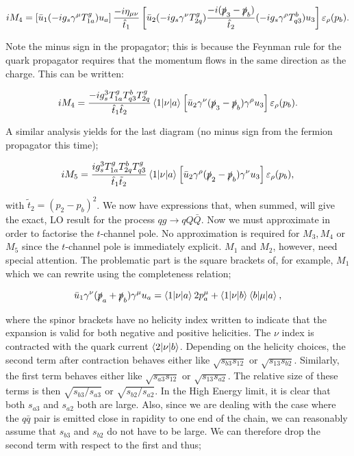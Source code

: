 \begin{equation}
iM_4 = \left[\bar{u}_1 (-i g_s \gamma^\mu T^g_{1a}) u_a \right] \frac{-i \eta_{\mu \nu}}{\hat{t}_1} \left[\bar{u}_2 (-i g_s \gamma^\nu T^g_{2q}) \frac{-i (\slashed{p}_3 - \slashed{p}_b )}{\hat{t}_2} (-i g_s \gamma^\rho T^b_{q3})u_3 \right] \varepsilon_\rho (p_b).
\end{equation}

Note the minus sign in the propagator; this is because the Feynman rule for the quark propagator requires that the momentum flows in the same direction as the charge. This can be written:

\begin{equation}
iM_4 = \frac{-i g_s^3 T^g_{1a}T^b_{q3}T^g_{2q}}{\hat{t}_1 \hat{t}_2} \mathinner{\langle1\vert\nu\vert a\rangle}_{}\left[\bar{u}_2 \gamma^\nu (\slashed{p}_3 - \slashed{p}_b) \gamma^\rho u_3 \right] \varepsilon_\rho (p_b).
\end{equation}

A similar analysis yields for the last diagram (no minus sign from the fermion propagator this time);

\begin{equation}
iM_5 = \frac{i g_s^3 T^g_{1a}T^b_{2q}T^g_{q3}}{\hat{t}_1 \tilde{t}_2} \mathinner{\langle1\vert\nu\vert a\rangle}_{}\left[\bar{u}_2 \gamma^\rho (\slashed{p}_2 - \slashed{p}_b) \gamma^\nu u_3 \right] \varepsilon_\rho (p_b),
\end{equation}

with $\tilde{t}_2 = (p_2 - p_b)^2$. We now have expressions that, when summed, will give the exact, LO result for the process $qg \to qQ\bar{Q}$. Now we must approximate in order to factorise the $t$-channel pole. No approximation is required for $M_3, M_4$ or $M_5$ since the $t$-channel pole is immediately explicit. $M_1$ and $M_2$, however, need special attention. The problematic part is the square brackets of, for example, $M_1$ which we can rewrite using the completeness relation;

\begin{equation}
\bar{u}_1 \gamma^\nu (\slashed{p}_a + \slashed{p}_b) \gamma^\mu u_a = \mathinner{\langle1\vert\nu\vert a\rangle}_{}2 p_a^\mu + \mathinner{\langle1\vert\nu\vert b\rangle}_{} \mathinner{\langle b\vert\mu\vert a\rangle}_{},
\end{equation}

where the spinor brackets have no helicity index written to indicate that the expansion is valid for both negative and positive helicities. The $\nu$ index is contracted with the quark current $\mathinner{\langle2\vert\nu\vert b\rangle}_{}$. Depending on the helicity choices, the second term after contraction behaves either like $\sqrt{s_{b3} s_{12}}$ or $\sqrt{s_{13} s_{b2}}$. Similarly, the first term behaves either like $\sqrt{s_{a3} s_{12}}$ or $\sqrt{s_{13} s_{a2}}$. The relative size of these terms is then $\sqrt{s_{b3}/s_{a3}}$ or $\sqrt{s_{b2}/s_{a2}}$. In the High Energy limit, it is clear that both $s_{a3}$ and $s_{a2}$ both are large. Also, since we are dealing with the case where the $q\bar{q}$ pair is emitted close in rapidity to one end of the chain, we can reasonably assume that $s_{b3}$ and $s_{b2}$ do not have to be large. We can therefore drop the second term with respect to the first and thus;

